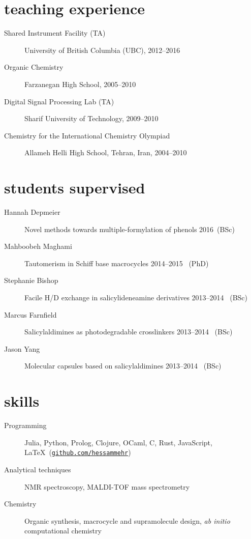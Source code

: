 \documentclass[overlapped,line,10pt,a4paper]{res}
\begin{document}
\begin{resume}
\section{teaching experience}
\begin{description}
\item[Shared Instrument Facility (TA)] University of British Columbia (UBC), 2012–2016
\item[Organic Chemistry] Farzanegan High School, 2005–2010
\item[Digital Signal Processing Lab (TA)] Sharif University of Technology, 2009–2010
\item[Chemistry for the International Chemistry Olympiad] Allameh Helli High School, Tehran, Iran, 2004–2010
\end{description}

\section{students supervised}
\begin{description}
\item[Hannah Depmeier] Novel methods towards multiple-formylation of phenols \hspace{\fill} 2016\, (BSc)
\item[Mahboobeh Maghami] Tautomerism in Schiff base macrocycles \hspace{\fill} 2014–2015 \, (PhD)
\item[Stephanie Bishop] Facile H/D exchange in salicylideneamine derivatives \hspace{\fill} 2013–2014 \, (BSc)
\item[Marcus Farnfield]  Salicylaldimines as photodegradable crosslinkers \hspace{\fill} 2013–2014 \, (BSc)
\item[Jason Yang]  Molecular capsules based on salicylaldimines \hspace{\fill} 2013–2014 \, (BSc)
\end{description}

\section{skills}
\begin{description}
\item[Programming] Julia, Python, Prolog, Clojure, OCaml, C, Rust, JavaScript, \LaTeX\ (\href{https://github.com/hessammehr}{\tt github.com/hessammehr})
\item[Analytical techniques] NMR spectroscopy, MALDI-TOF mass spectrometry
\item[Chemistry] Organic synthesis, macrocycle and supramolecule design, \emph{ab initio} computational chemistry
\end{description}
\end{resume}
\end{document}
